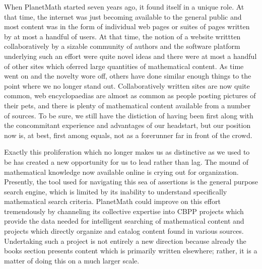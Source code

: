 When PlanetMath started seven years ago, it found itself in a unique
role. At that time, the internet was just becoming available to the
general public and most content was in the form of individual web pages
or suites of pages written by at most a handful of users. At that time,
the notion of a website writtten collaboratively by a sizable community
of authors and the software platform underlying such an effort were
quite novel ideas and there were at most a handful of other sites which
oferred large quantities of mathematical content. As time went on and
the novelty wore off, others have done similar enough things to the
point where we no longer stand out. Collaboratively written sites are
now quite common, web encyclopaedias are almost as common as people
posting pictures of their pets, and there is plenty of mathematical
content available from a number of sources. To be sure, we still have
the distiction of having been first along with the concommitant
experience and advantages of our headstart, but our position now is, at
best, first among equals, not as a forerunner far in front of the crowd.

Exactly this proliferation which no longer makes us as distinctive as we
used to be has created a new opportunity for us to lead rather than lag.
The mound of mathematical knowledge now available online is crying out
for organization. Presently, the tool used for navigating this sea of
assertions is the general purpose search engine, which is limited by its
inability to understand specifically mathematical search criteria.
PlanetMath could improve on this effort tremendously by channeling its
collective expertise into CBPP projects which provide the data needed
for intelligent searching of mathematical content and projects which
directly organize and catalog content found in various sources.
Undertaking such a project is not entirely a new direction because
already the books section presents content which is primarily written
elsewhere; rather, it is a matter of doing this on a much larger scale.

